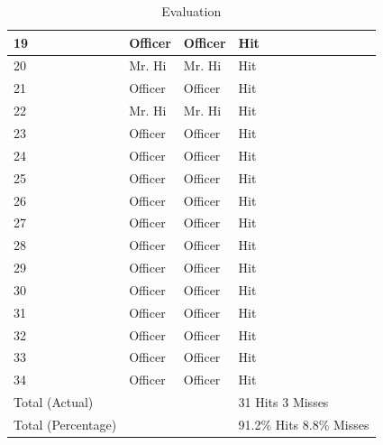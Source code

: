 \documentclass[letterpaper,11pt]{report}
\begin{document}
\begin{savenotes}
\begin{table}
\begin{tabular}{|l|l|l|l|}
    19                 & Officer               & Officer   & Hit                \\ \hline
    20                 & Mr. Hi                & Mr. Hi    & Hit                \\ \hline
    21                 & Officer               & Officer   & Hit                \\ \hline
    22                 & Mr. Hi                & Mr. Hi    & Hit                \\ \hline
    23                 & Officer               & Officer   & Hit                \\ \hline
    24                 & Officer               & Officer   & Hit                \\ \hline
    25                 & Officer               & Officer   & Hit                \\ \hline
    26                 & Officer               & Officer   & Hit                \\ \hline
    27                 & Officer               & Officer   & Hit                \\ \hline
    28                 & Officer               & Officer   & Hit                \\ \hline
    29                 & Officer               & Officer   & Hit                \\ \hline
    30                 & Officer               & Officer   & Hit                \\ \hline
    31                 & Officer               & Officer   & Hit                \\ \hline
    32                 & Officer               & Officer   & Hit                \\ \hline
    33                 & Officer               & Officer   & Hit                \\ \hline
    34                 & Officer               & Officer   & Hit                \\ \hline
    Total (Actual)     & ~                     & ~         & 31 Hits 3 Misses   \\ \hline
    Total (Percentage) & ~                     & ~         & 91.2\% Hits 8.8\% Misses \\ \hline
    \end{tabular}
			\caption{Evaluation}
	\label{tab:Evaluation}
\end{table}


\end{savenotes}
\end{document}
